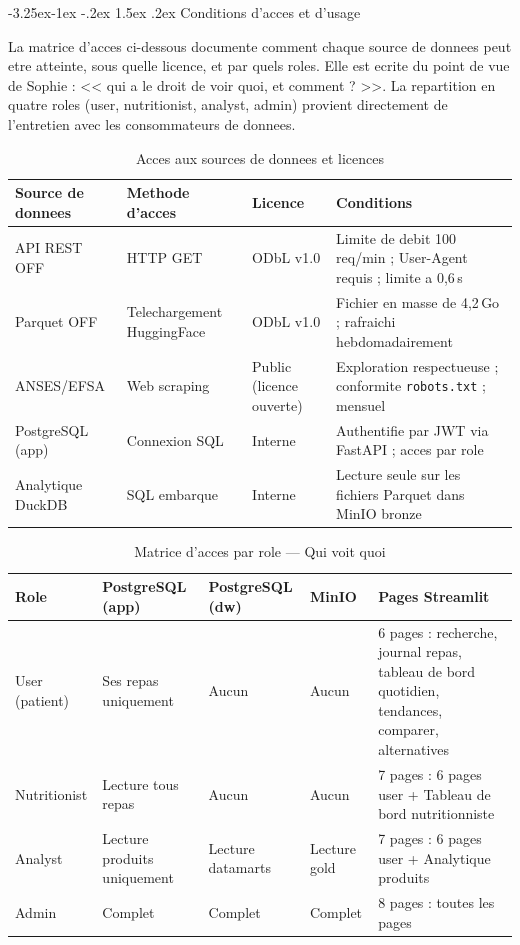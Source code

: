 \documentclass[a4paper,11pt,oneside,openany]{report}
\makeatletter
\renewcommand\subsubsection{\@startsection{subsubsection}{3}{\z@}%
  {-3.25ex\@plus -1ex \@minus -.2ex}%
  {1.5ex \@plus .2ex}%
  {\normalfont\normalsize\bfseries\color{ntblue}}}
\makeatother
\begin{document}
\subsubsection{Conditions d'acces et d'usage}

La matrice d'acces ci-dessous documente comment chaque source de
donnees peut etre atteinte, sous quelle licence, et par quels roles.
Elle est ecrite du point de vue de Sophie : << qui a le droit de voir
quoi, et comment ? >>. La repartition en quatre roles (user,
nutritionist, analyst, admin) provient directement de l'entretien avec
les consommateurs de donnees.

\begin{table}[H]
\centering
\caption{Acces aux sources de donnees et licences}
\label{tab:access-conditions}
\begin{tabularx}{\textwidth}{L{2.5cm} L{2.5cm} L{3cm} L{4.5cm}}
\toprule
\textbf{Source de donnees} & \textbf{Methode d'acces} & \textbf{Licence} & \textbf{Conditions} \\
\midrule
API REST OFF & HTTP GET & ODbL v1.0 & Limite de debit 100 req/min ; User-Agent requis ; limite a 0,6\,s \\
Parquet OFF & Telechargement HuggingFace & ODbL v1.0 & Fichier en masse de 4,2\,Go ; rafraichi hebdomadairement \\
ANSES/EFSA & Web scraping & Public (licence ouverte) & Exploration respectueuse ; conformite \texttt{robots.txt} ; mensuel \\
PostgreSQL (app) & Connexion SQL & Interne & Authentifie par JWT via FastAPI ; acces par role \\
Analytique DuckDB & SQL embarque & Interne & Lecture seule sur les fichiers Parquet dans MinIO bronze \\
\bottomrule
\end{tabularx}
\end{table}

\begin{table}[H]
\centering
\caption{Matrice d'acces par role --- Qui voit quoi}
\label{tab:rbac-matrix}
\begin{tabularx}{\textwidth}{L{2.3cm} L{2.8cm} L{2.8cm} L{2.8cm} L{2.3cm}}
\toprule
\textbf{Role} & \textbf{PostgreSQL (app)} & \textbf{PostgreSQL (dw)} & \textbf{MinIO} & \textbf{Pages Streamlit} \\
\midrule
User (patient) & Ses repas uniquement & Aucun & Aucun & 6 pages : recherche, journal repas, tableau de bord quotidien, tendances, comparer, alternatives \\
Nutritionist & Lecture tous repas & Aucun & Aucun & 7 pages : 6 pages user + Tableau de bord nutritionniste \\
Analyst & Lecture produits uniquement & Lecture datamarts & Lecture gold & 7 pages : 6 pages user + Analytique produits \\
Admin & Complet & Complet & Complet & 8 pages : toutes les pages \\
\bottomrule
\end{tabularx}
\end{table}
\end{document}
